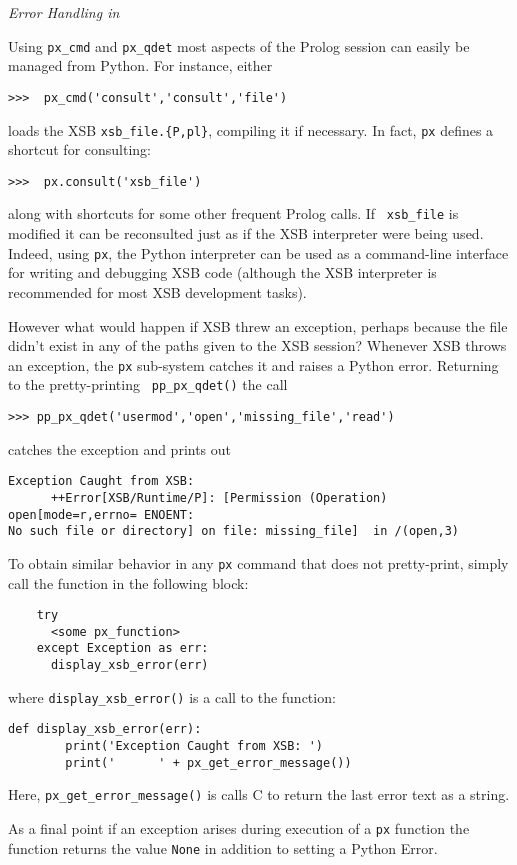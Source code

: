 \begin{example} \rm {\it Error Handling in \px}

Using {\tt px\_cmd} and {\tt px\_qdet} most aspects of the Prolog
session can easily be managed from Python.  For instance, either

\begin{verbatim}
>>>  px_cmd('consult','consult','file')
\end{verbatim}

\noindent
loads the XSB {\tt xsb\_file.\{P,pl\}}, compiling it if necessary.  In
fact, {\tt px} defines a shortcut for consulting:

\begin{verbatim}
>>>  px.consult('xsb_file')
\end{verbatim}

\noindent
along with shortcuts for some other frequent Prolog calls.  If {\tt
  xsb\_file} is modified it can be reconsulted just as if the XSB
interpreter were being used.  Indeed, using {\tt px}, the Python
interpreter can be used as a command-line interface for writing and
debugging XSB code (although the XSB interpreter is recommended for
most XSB development tasks).

However what would happen if XSB threw an exception, perhaps because
the file didn't exist in any of the paths given to the XSB session?
Whenever XSB throws an exception, the {\tt px} sub-system catches it
and raises a Python error.  Returning to the pretty-printing {\tt
  pp\_px\_qdet()} the call

\begin{verbatim}
>>> pp_px_qdet('usermod','open','missing_file','read')
\end{verbatim}

\noindent
catches the exception and prints out

\begin{verbatim} 
Exception Caught from XSB: 
      ++Error[XSB/Runtime/P]: [Permission (Operation) open[mode=r,errno= ENOENT: 
No such file or directory] on file: missing_file]  in /(open,3)
\end{verbatim}

To obtain similar behavior in any {\tt px} command that does not
pretty-print, simply call the function in the following block:

\begin{verbatim}
    try
      <some px_function>
    except Exception as err:
      display_xsb_error(err)
\end{verbatim}
\noindent
where {\tt display\_xsb\_error()} is a call to the function:

\begin{verbatim}
def display_xsb_error(err):    
        print('Exception Caught from XSB: ')
        print('      ' + px_get_error_message())
\end{verbatim}

\noindent
Here, {\tt px\_get\_error\_message()} is calls C to return the last
\px{} error text as a string.

As a final point if an exception arises during execution of a {\tt px}
function the function returns the value {\tt None} in addition to
setting a Python Error.
\end{example}

